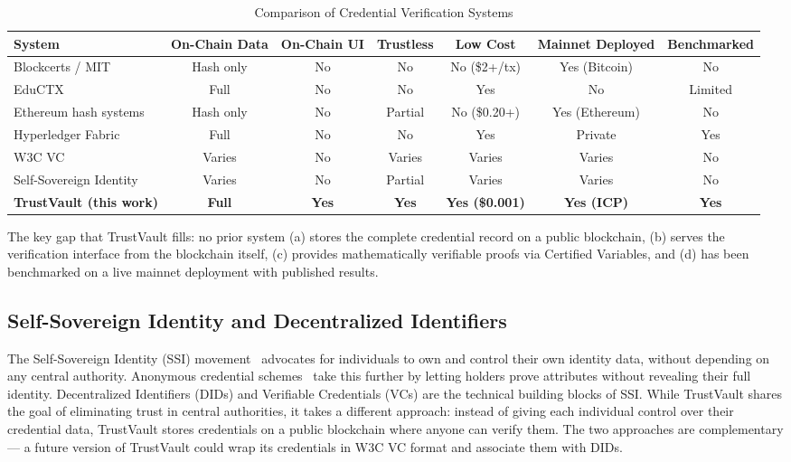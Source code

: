 \documentclass[conference]{IEEEtran}
\begin{document}
\begin{table}[t]
\caption{Comparison of Credential Verification Systems}
\label{tab:related_comparison}
\centering\small\renewcommand{\arraystretch}{1.2}
\begin{tabular}{@{}lcccccc@{}}
\toprule
\textbf{System} & \textbf{On-Chain Data} & \textbf{On-Chain UI} & \textbf{Trustless} & \textbf{Low Cost} & \textbf{Mainnet Deployed} & \textbf{Benchmarked} \\
\midrule
Blockcerts / MIT~\cite{grech2017blockchain}        & Hash only  & No  & No  & No (\$2+/tx)  & Yes (Bitcoin) & No \\
EduCTX~\cite{turk2018eductx}                       & Full       & No  & No  & Yes           & No            & Limited \\
Ethereum hash systems~\cite{lizcano2020blockchain}  & Hash only  & No  & Partial & No (\$0.20+) & Yes (Ethereum) & No \\
Hyperledger Fabric~\cite{androulaki2018fabric}      & Full       & No  & No  & Yes           & Private       & Yes \\
W3C VC~\cite{w3c2022vc}                            & Varies     & No  & Varies & Varies       & Varies        & No \\
Self-Sovereign Identity~\cite{allen2016decentralized} & Varies  & No  & Partial & Varies       & Varies        & No \\
\textbf{TrustVault (this work)}                     & \textbf{Full} & \textbf{Yes} & \textbf{Yes} & \textbf{Yes (\$0.001)} & \textbf{Yes (ICP)} & \textbf{Yes} \\
\bottomrule
\end{tabular}
\end{table}

The key gap that TrustVault fills: no prior system (a) stores the complete credential record on a public blockchain, (b) serves the verification interface from the blockchain itself, (c) provides mathematically verifiable proofs via Certified Variables, and (d) has been benchmarked on a live mainnet deployment with published results.

\subsection{Self-Sovereign Identity and Decentralized Identifiers}

The Self-Sovereign Identity (SSI) movement~\cite{allen2016decentralized} advocates for individuals to own and control their own identity data, without depending on any central authority. Anonymous credential schemes~\cite{camenisch2001efficient} take this further by letting holders prove attributes without revealing their full identity. Decentralized Identifiers (DIDs) and Verifiable Credentials (VCs) are the technical building blocks of SSI. While TrustVault shares the goal of eliminating trust in central authorities, it takes a different approach: instead of giving each individual control over their credential data, TrustVault stores credentials on a public blockchain where anyone can verify them. The two approaches are complementary — a future version of TrustVault could wrap its credentials in W3C VC format and associate them with DIDs.
\end{document}
